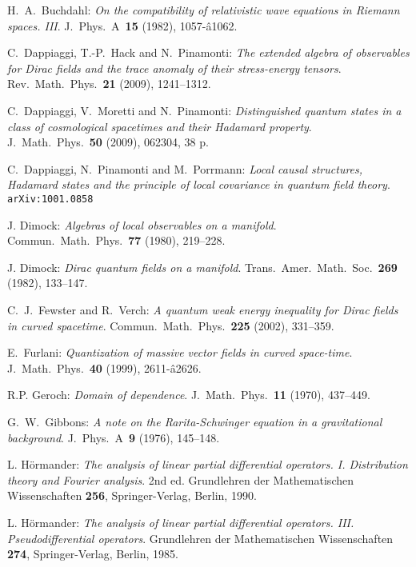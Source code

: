 \documentclass[a4paper,11pt]{amsart}
\theoremstyle{definition}
\begin{document}
\begin{thebibliography}{11}
{\sc H.~A.~Buchdahl:}
{\em On the compatibility of relativistic wave equations in Riemann spaces. III}.
J.\ Phys.~A~\textbf{15} (1982), 1057-â1062.

{\sc C.~Dappiaggi, T.-P.~Hack and N.~Pinamonti:}
{\em The extended algebra of observables for Dirac fields and the trace anomaly of their stress-energy tensors}.
Rev.\ Math.\ Phys.~\textbf{21} (2009), 1241--1312.

{\sc C.~Dappiaggi, V.~Moretti and N.~Pinamonti:}
{\em Distinguished quantum states in a class of cosmological spacetimes and their Hadamard property}.
J.~Math.\ Phys.~\textbf{50} (2009), 062304, 38 p.

{\sc C.~Dappiaggi, N.~Pinamonti and M.~Porrmann:}
{\em Local causal structures, Hadamard states and the principle of local covariance in quantum field theory}.
\texttt{arXiv:1001.0858}

{\sc J. Dimock:} 
{\em Algebras of local observables on a manifold}.  
Commun.\ Math.\ Phys.~\textbf{77} (1980), 219--228.

{\sc J. Dimock:} 
{\em Dirac quantum fields on a manifold}.  
Trans.\ Amer.\ Math.\ Soc.~\textbf{269} (1982), 133--147.

{\sc C.~J.~Fewster and R.~Verch:}
{\em A quantum weak energy inequality for Dirac fields in curved spacetime}.
Commun.\ Math.\ Phys.~\textbf{225} (2002), 331--359.

{\sc E.~Furlani:} 
{\em Quantization of massive vector fields in curved space-time}.  
J.\ Math.\ Phys.~\textbf{40} (1999), 2611-â2626.

{\sc R.P. Geroch:}
{\em Domain of dependence}.
J.\ Math.\ Phys.~\textbf{11} (1970), 437--449. 

{\sc G.~W.~Gibbons:}
{\em A note on the Rarita-Schwinger equation in a gravitational background}.
J.~Phys.~A~\textbf{9} (1976), 145--148.

{\sc L. H\"ormander:}
{\em The analysis of linear partial differential operators. I. Distribution theory and Fourier analysis}. 2nd ed.
Grundlehren der Mathematischen Wissenschaften \textbf{256}, Springer-Verlag, Berlin, 1990.

{\sc L. H\"ormander:}
{\em The analysis of linear partial differential operators. III. Pseudodifferential operators}. 
Grundlehren der Mathematischen Wissenschaften \textbf{274}, Springer-Verlag, Berlin, 1985.


\end{thebibliography}
\end{document}
